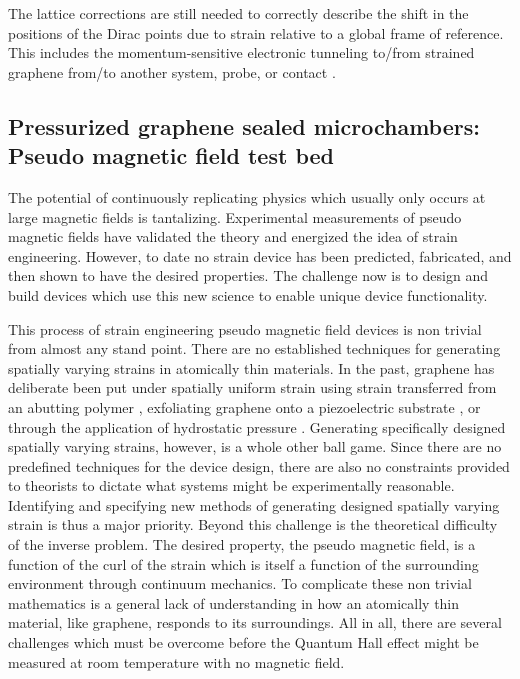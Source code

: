 The lattice corrections are still needed to correctly describe the shift in the positions of the Dirac points due to strain relative to a global frame of reference.
This includes the momentum-sensitive electronic tunneling to/from strained graphene from/to another system, probe, or contact \cite{Fogler2008}.

\subsection{Pressurized graphene sealed microchambers: Pseudo magnetic field test bed}
The potential of continuously replicating physics which usually only occurs at large magnetic fields is tantalizing.
Experimental measurements of pseudo magnetic fields \cite{Levy2010,Yan2012,Yeh2011,Gomes2012} have validated the theory and energized the idea of strain engineering.
However, to date no strain device has been predicted, fabricated, and then shown to have the desired properties.
The challenge now is to design and build devices which use this new science to enable unique device functionality.

This process of strain engineering pseudo magnetic field devices is non trivial from almost any stand point.
There are no established techniques for generating spatially varying strains in atomically thin materials.
In the past, graphene has deliberate been put under spatially uniform strain using strain transferred from an abutting polymer \cite{Yu2008,Ni2008,Tsoukleri2009,Huang2009,Mohiuddin2009,Frank2010,Yoon2011}, exfoliating graphene onto a piezoelectric substrate \cite{Ding2010,Jie2013}, or through the application of hydrostatic pressure \cite{Proctor2009,Clark2012}.
Generating specifically designed spatially varying strains, however, is a whole other ball game.
Since there are no predefined techniques for the device design, there are also no constraints provided to theorists to dictate what systems might be experimentally reasonable.
Identifying and specifying new methods of generating designed spatially varying strain is thus a major priority.
Beyond this challenge is the theoretical difficulty of the inverse problem.
The desired property, the pseudo magnetic field, is a function of the curl of the strain which is itself a function of the surrounding environment through continuum mechanics.
To complicate these non trivial mathematics is a general lack of understanding in how an atomically thin material, like graphene, responds to its surroundings.
All in all, there are several challenges which must be overcome before the Quantum Hall effect might be measured at room temperature with no magnetic field.

